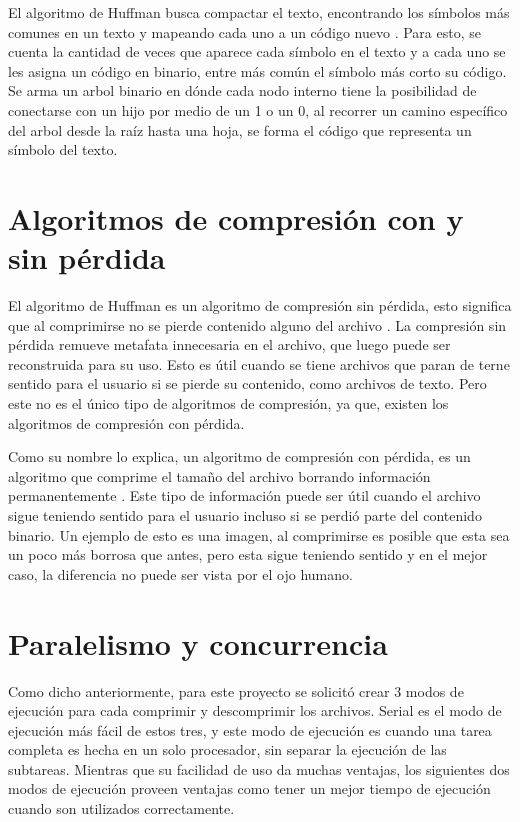 \documentclass{report}
\begin{document}
El algoritmo de Huffman busca compactar el texto, encontrando los símbolos más comunes en un texto y mapeando cada uno a un código nuevo \cite{ref3}.
Para esto, se cuenta la cantidad de veces que aparece cada símbolo en el texto y a cada uno se les asigna un código en binario, entre más común el símbolo más corto su código.
Se arma un arbol binario en dónde cada nodo interno tiene la posibilidad de conectarse con un hijo por medio de un 1 o un 0, al recorrer un camino específico del arbol desde la raíz hasta una hoja, se forma el código que representa un símbolo del texto. 



\section {Algoritmos de compresión con y sin pérdida}

El algoritmo de Huffman es un algoritmo de compresión sin pérdida, esto significa que al comprimirse no se pierde contenido alguno del archivo \cite{ref4}.
La compresión sin pérdida remueve metafata innecesaria en el archivo, que luego puede ser reconstruida para su uso.
Esto es útil cuando se tiene archivos que paran de terne sentido para el usuario si se pierde su contenido, como archivos de texto.
Pero este no es el único tipo de algoritmos de compresión, ya que, existen los algoritmos de compresión con pérdida.

Como su nombre lo explica, un algoritmo de compresión con pérdida, es un algoritmo que comprime el tamaño del archivo borrando información permanentemente \cite{ref4}.
Este tipo de información puede ser útil cuando el archivo sigue teniendo sentido para el usuario incluso si se perdió parte del contenido binario.
Un ejemplo de esto es una imagen,  al comprimirse es posible que esta sea un poco más borrosa que antes, pero esta sigue teniendo sentido y en el mejor caso, la diferencia no puede ser vista por el ojo humano.


\section{Paralelismo y concurrencia}

Como dicho anteriormente, para este proyecto se solicitó crear 3 modos de ejecución para cada comprimir y descomprimir los archivos. 
Serial es el modo de ejecución más fácil de estos tres, y este modo de ejecución es cuando una tarea completa es hecha en un solo procesador, sin separar la ejecución de las subtareas.
Mientras que su facilidad de uso da muchas ventajas, los siguientes dos modos de ejecución proveen ventajas como tener un mejor tiempo de ejecución cuando son utilizados correctamente.
\end{document}
